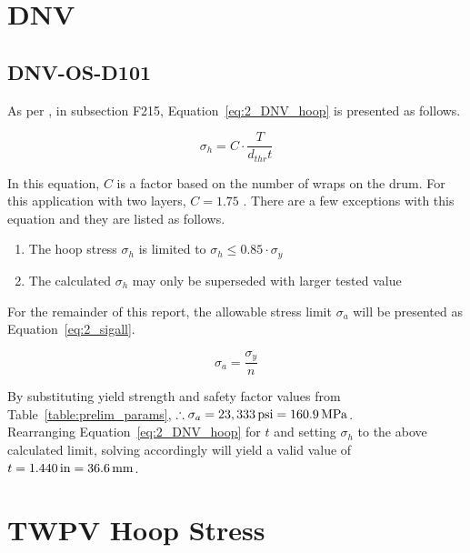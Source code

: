 \section{DNV}

\subsection{DNV-OS-D101}
\label{section:2_DNV}

As per \cite{DNVOSD101}, in subsection F215, Equation~\ref{eq:2_DNV_hoop} is presented as follows.

\begin{equation}
	\label{eq:2_DNV_hoop}
	\sigma_h = C\cdot\frac{T}{d_{thr}t}
\end{equation}

In this equation, $C$ is a factor based on the number of wraps on the drum. For this application with two layers, $C=1.75$ \cite{DNVOSD101}. There are a few exceptions with this equation and they are listed as follows.

\begin{enumerate}
	\item The hoop stress $\sigma_h$ is limited to $\sigma_h \leq 0.85\cdot \sigma_y$
	\item The calculated $\sigma_h$  may only be superseded with larger tested value\\
\end{enumerate}

For the remainder of this report, the allowable stress limit $\sigma_a$ will be presented as Equation~\ref{eq:2_sigall}.

\begin{equation}
	\label{eq:2_sigall}
	\sigma_a = \frac{\sigma_y}{n}
\end{equation}

By substituting yield strength and safety factor values from Table~\ref{table:prelim_params}, $\therefore \sigma_a= 23,333 \,\mathrm{psi}= 160.9 \,\mathrm{MPa}$.\\

Rearranging Equation~\ref{eq:2_DNV_hoop} for $t$ and setting $\sigma_h$ to the above calculated limit, solving accordingly will yield a valid value of $t = 1.440 \,\mathrm{in} = 36.6\,\mathrm{mm}$. 

\section{TWPV Hoop Stress}
\label{section:2_TWPV}

